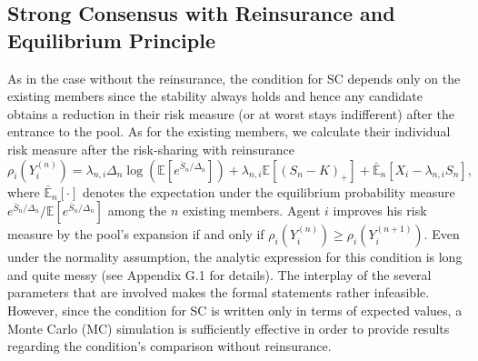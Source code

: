 \documentclass[fleqn,mnsc,nonblindrev]{informs4}
\newcommand{\EE}{\mathbb{E}}
\begin{document}
\subsection{Strong Consensus with Reinsurance and Equilibrium Principle}
As in the case without the reinsurance, the condition for SC depends only on the existing members since the stability always holds and hence any candidate obtains a reduction in their risk measure (or at worst stays indifferent) after the entrance to the pool. As for the existing members, we calculate their individual risk measure after the risk-sharing with reinsurance  {$\rho_i(Y^{(n)}_i)=\lambda_{n,i}\Delta_n\log\left( \EE[e^{\bar{S}_n/\Delta_n}]\right)+\lambda_{n,i}\EE[(S_n-K)_+]+\bar{\EE}_n[X_i-\lambda_{n,i}S_n],$} where $\bar{\EE}_n[\cdot]$ denotes the expectation under the equilibrium probability measure  $e^{\bar{S}_n/\Delta_n}/\EE[e^{\bar{S}_n/\Delta_n}]$ among the $n$ existing members. Agent $i$ improves his risk measure by the pool's expansion if and only if   {$\rho_i(Y^{(n)}_i)\geq \rho_i(Y^{(n+1)}_i)$.}
Even under the normality assumption, the analytic expression for   {this condition} is long and quite messy (see Appendix G.1 %
for details). The interplay of the several parameters that are involved makes the formal statements rather infeasible. However, since the condition for SC is written only in terms of expected values, a Monte Carlo (MC) simulation is sufficiently effective in order to provide results regarding the condition's comparison without reinsurance.  
\end{document}
